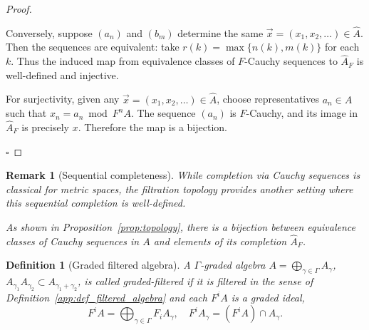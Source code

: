 \documentclass[a4paper,12pt]{amsart}
\newtheorem{deff}{Definition}
\newtheorem{rem}{Remark}
\begin{document}
\begin{proof}{\mbox{}\vskip 2mm}
\begin{enumerate}
\noindent
Conversely, suppose $(a_n)$ and $(b_m)$ determine the same $\vec{x} = (x_1, x_2, \ldots) \in \hat{A}$. Then the sequences are equivalent: take $r(k) = \max\{n(k), m(k)\}$ for each $k$. Thus the induced map from equivalence classes of $F$-Cauchy sequences to $\hat{A}_F$ is well-defined and injective.

\noindent
For surjectivity, given any $\vec{x} = (x_1, x_2, \ldots) \in \hat{A}$, choose representatives $a_n \in A$ such that $x_n = a_n \bmod F^n A$. The sequence $(a_n)$ is $F$-Cauchy, and its image in $\hat{A}_F$ is precisely $x$. Therefore the map is a bijection.
\end{enumerate}
$\square$
\end{proof}
\fi


\begin{rem}[Sequential completeness]\label{app:rem_sequential_completeness}\normalfont
 While completion via Cauchy sequences is classical for metric spaces, the filtration topology provides another setting where this sequential completion is well-defined. 

\noindent As shown in Proposition~\ref{prop:topology}, there is a bijection between equivalence classes of Cauchy sequences in $A$ and elements of its completion $\hat{A}_F$. 
 

\end{rem}







\begin{deff}[Graded filtered algebra]\label{app:def_graded_filtered}
A $\Gamma$-graded algebra $A=\bigoplus_{\gamma\in\Gamma}A_\gamma$, $A_{\gamma_1}A_{\gamma_2}\subset A_{\gamma_1+\gamma_2}$, is called \emph{graded-filtered} if it is filtered in the sense of Definition~\ref{app:def_filtered_algebra} and each $F^iA$ is a \emph{graded ideal},
\[
F^iA=\bigoplus_{\gamma\in\Gamma}F_iA_\gamma, \quad F^iA_\gamma=(F^iA)\cap A_\gamma.
\]
\end{deff}
\end{document}
